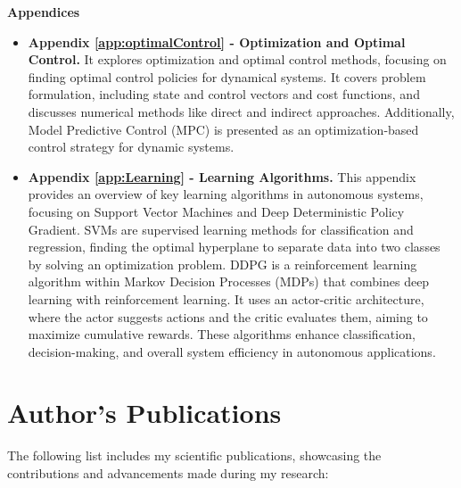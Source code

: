 \textbf{Appendices}
\begin{itemize}
	\item \textbf{Appendix \textcolor{red}{\ref{app:optimalControl}} - Optimization and Optimal Control. \newline  }
		It explores optimization and optimal control methods, focusing on finding optimal control policies for dynamical systems. It covers problem formulation, including state and control vectors and cost functions, and discusses numerical methods like direct and indirect approaches. Additionally, Model Predictive Control (MPC) is presented as an optimization-based control strategy for dynamic systems.
	
	\item \textbf{Appendix \textcolor{red}{\ref{app:Learning}} -  Learning Algorithms. \newline} 
	This appendix provides an overview of key learning algorithms in autonomous systems, focusing on Support Vector Machines  and Deep Deterministic Policy Gradient. SVMs are supervised learning methods for classification and regression, finding the optimal hyperplane to separate data into two classes by solving an optimization problem. DDPG is a reinforcement learning algorithm within Markov Decision Processes (MDPs) that combines deep learning with reinforcement learning. It uses an actor-critic architecture, where the actor suggests actions and the critic evaluates them, aiming to maximize cumulative rewards. These algorithms enhance classification, decision-making, and overall system efficiency in autonomous applications.
\end{itemize}








\section{Author's Publications}

The following list includes my scientific publications, showcasing the contributions and advancements made during my research:

